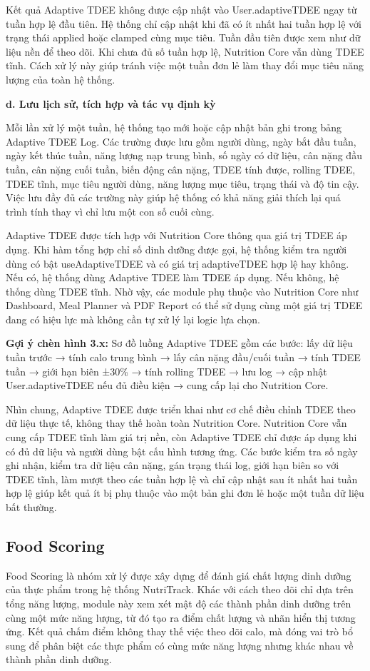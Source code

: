 \documentclass[12pt, a4paper]{report}
\begin{document}
Kết quả Adaptive TDEE không được cập nhật vào User.adaptiveTDEE ngay từ tuần hợp lệ đầu tiên. Hệ thống chỉ cập nhật khi đã có ít nhất hai tuần hợp lệ với trạng thái applied hoặc clamped cùng mục tiêu. Tuần đầu tiên được xem như dữ liệu nền để theo dõi. Khi chưa đủ số tuần hợp lệ, Nutrition Core vẫn dùng TDEE tĩnh. Cách xử lý này giúp tránh việc một tuần đơn lẻ làm thay đổi mục tiêu năng lượng của toàn hệ thống.

\textbf{d. Lưu lịch sử, tích hợp và tác vụ định kỳ}

Mỗi lần xử lý một tuần, hệ thống tạo mới hoặc cập nhật bản ghi trong bảng Adaptive TDEE Log. Các trường được lưu gồm người dùng, ngày bắt đầu tuần, ngày kết thúc tuần, năng lượng nạp trung bình, số ngày có dữ liệu, cân nặng đầu tuần, cân nặng cuối tuần, biến động cân nặng, TDEE tính được, rolling TDEE, TDEE tĩnh, mục tiêu người dùng, năng lượng mục tiêu, trạng thái và độ tin cậy. Việc lưu đầy đủ các trường này giúp hệ thống có khả năng giải thích lại quá trình tính thay vì chỉ lưu một con số cuối cùng.

Adaptive TDEE được tích hợp với Nutrition Core thông qua giá trị TDEE áp dụng. Khi hàm tổng hợp chỉ số dinh dưỡng được gọi, hệ thống kiểm tra người dùng có bật useAdaptiveTDEE và có giá trị adaptiveTDEE hợp lệ hay không. Nếu có, hệ thống dùng Adaptive TDEE làm TDEE áp dụng. Nếu không, hệ thống dùng TDEE tĩnh. Nhờ vậy, các module phụ thuộc vào Nutrition Core như Dashboard, Meal Planner và PDF Report có thể sử dụng cùng một giá trị TDEE đang có hiệu lực mà không cần tự xử lý lại logic lựa chọn.

\textbf{Gợi ý chèn hình 3.x:} Sơ đồ luồng Adaptive TDEE gồm các bước: lấy dữ liệu tuần trước → tính calo trung bình → lấy cân nặng đầu/cuối tuần → tính TDEE tuần → giới hạn biên ±30\% → tính rolling TDEE → lưu log → cập nhật User.adaptiveTDEE nếu đủ điều kiện → cung cấp lại cho Nutrition Core.

Nhìn chung, Adaptive TDEE được triển khai như cơ chế điều chỉnh TDEE theo dữ liệu thực tế, không thay thế hoàn toàn Nutrition Core. Nutrition Core vẫn cung cấp TDEE tĩnh làm giá trị nền, còn Adaptive TDEE chỉ được áp dụng khi có đủ dữ liệu và người dùng bật cấu hình tương ứng. Các bước kiểm tra số ngày ghi nhận, kiểm tra dữ liệu cân nặng, gán trạng thái log, giới hạn biên so với TDEE tĩnh, làm mượt theo các tuần hợp lệ và chỉ cập nhật sau ít nhất hai tuần hợp lệ giúp kết quả ít bị phụ thuộc vào một bản ghi đơn lẻ hoặc một tuần dữ liệu bất thường.

\subsection{Food Scoring}Food Scoring là nhóm xử lý được xây dựng để đánh giá chất lượng dinh dưỡng của thực phẩm trong hệ thống NutriTrack. Khác với cách theo dõi chỉ dựa trên tổng năng lượng, module này xem xét mật độ các thành phần dinh dưỡng trên cùng một mức năng lượng, từ đó tạo ra điểm chất lượng và nhãn hiển thị tương ứng. Kết quả chấm điểm không thay thế việc theo dõi calo, mà đóng vai trò bổ sung để phân biệt các thực phẩm có cùng mức năng lượng nhưng khác nhau về thành phần dinh dưỡng.
\end{document}
